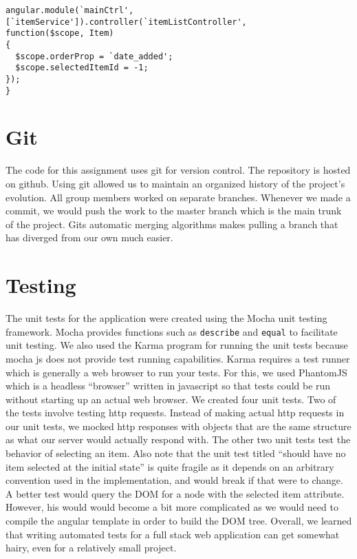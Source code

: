 \documentclass[letterpaper, 12pt]{article}
\begin{document}
\vspace{2mm}
\vspace{-3mm}\begin{verbatim}
angular.module(`mainCtrl',
[`itemService']).controller(`itemListController',
function($scope, Item) 
{
  $scope.orderProp = `date_added';
  $scope.selectedItemId = -1;
}); 
}
\end{verbatim}

\section{Git}
The code for this assignment uses git for version control. The repository is
hosted on github.  Using git allowed us to maintain an organized history of the project's evolution.  All group members worked on separate branches. Whenever we made a commit, we would push the work to the master branch which is the main trunk of the project. Gits automatic merging algorithms makes pulling a branch that has diverged from our own much easier.

\section{Testing}
The unit tests for the application were created using the Mocha unit testing framework.  Mocha provides functions such as \texttt{describe} and \texttt{equal} to facilitate unit testing. We also used the Karma program for running the unit tests because mocha js does not provide test running capabilities. Karma requires a test runner which is generally a web browser to run your tests.  For this, we used PhantomJS which is a headless ``browser'' written in javascript so that tests could be run without starting up an actual web browser.  We created four unit tests.  Two of the tests involve testing http requests.  Instead of making actual http requests in our unit tests, we mocked http responses with objects that are the same structure as what our server would actually respond with.  The other two unit tests test the behavior of selecting an item. Also note that the unit test titled ``should have no item selected at the initial state'' is quite fragile as it depends on an arbitrary convention used in the implementation, and would break if that were to change. A better test would query the DOM for a node with the selected item attribute. However, his would would become a bit more complicated as we would need to compile the angular template in order to build the DOM tree. Overall, we learned that writing automated tests for a full stack web application can get somewhat hairy, even for a relatively small project.
\end{document}
